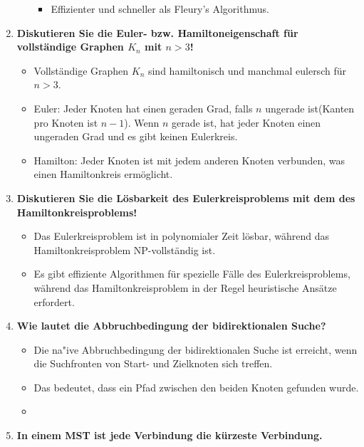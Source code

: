 \documentclass[12pt]{scrartcl}
\begin{document}
\begin{enumerate}
\begin{itemize}
\begin{itemize}
                        \item Effizienter und schneller als Fleury's Algorithmus.
                    \end{itemize}
          \end{itemize}
    \item \textbf{Diskutieren Sie die Euler- bzw. Hamiltoneigenschaft für vollständige Graphen $K_n$ mit $n > 3$!}
          \begin{itemize}
              \item Vollständige Graphen $K_n$ sind hamiltonisch und manchmal eulersch für $n > 3$.
              \item Euler: Jeder Knoten hat einen geraden Grad, falls $n$ ungerade ist(Kanten pro Knoten ist $n-1$).
                    Wenn $n$ gerade ist, hat jeder Knoten einen ungeraden Grad und es gibt keinen Eulerkreis.
              \item Hamilton: Jeder Knoten ist mit jedem anderen Knoten verbunden, was einen Hamiltonkreis ermöglicht.
          \end{itemize}
          \pagebreak
    \item \textbf{Diskutieren Sie die Lösbarkeit des Eulerkreisproblems mit dem des Hamiltonkreisproblems!}
          \begin{itemize}
              \item Das Eulerkreisproblem ist in polynomialer Zeit lösbar, während das Hamiltonkreisproblem NP-vollständig ist.
              \item Es gibt effiziente Algorithmen für spezielle Fälle des Eulerkreisproblems, während das Hamiltonkreisproblem in der Regel heuristische Ansätze erfordert.
          \end{itemize}
    \item \textbf{Wie lautet die Abbruchbedingung der bidirektionalen Suche?}
          \begin{itemize}
              \item Die na"ive Abbruchbedingung der bidirektionalen Suche ist erreicht, wenn die Suchfronten von Start- und Zielknoten sich treffen.
              \item Das bedeutet, dass ein Pfad zwischen den beiden Knoten gefunden wurde.
              \item
          \end{itemize}
    \item \textbf{In einem MST ist jede Verbindung die kürzeste Verbindung.}
          \begin{itemize}

\end{itemize}
\end{enumerate}
\end{document}
